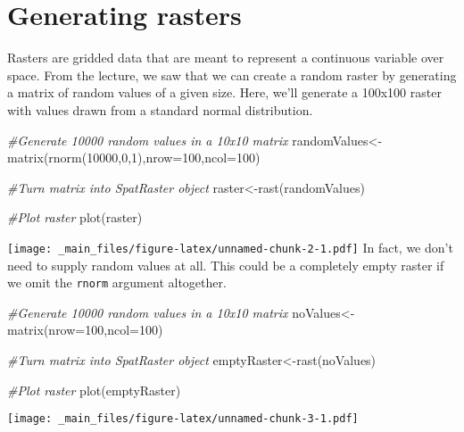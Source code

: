 \documentclass[
]{book}
\newenvironment{Shaded}{\begin{snugshade}}{\end{snugshade}}
\newcommand{\AttributeTok}[1]{\textcolor[rgb]{0.77,0.63,0.00}{#1}}
\newcommand{\CommentTok}[1]{\textcolor[rgb]{0.56,0.35,0.01}{\textit{#1}}}
\newcommand{\DecValTok}[1]{\textcolor[rgb]{0.00,0.00,0.81}{#1}}
\newcommand{\FunctionTok}[1]{\textcolor[rgb]{0.00,0.00,0.00}{#1}}
\newcommand{\NormalTok}[1]{#1}
\newcommand{\OtherTok}[1]{\textcolor[rgb]{0.56,0.35,0.01}{#1}}
\begin{document}
\hypertarget{generating-rasters}{%
\section{Generating rasters}\label{generating-rasters}}

Rasters are gridded data that are meant to represent a continuous variable over space. From the lecture, we saw that we can create a random raster by generating a matrix of random values of a given size. Here, we'll generate a 100x100 raster with values drawn from a standard normal distribution.

\begin{Shaded}
\begin{Highlighting}[]
\CommentTok{\#Generate 10000 random values in a 10x10 matrix}
\NormalTok{randomValues}\OtherTok{\textless{}{-}}\FunctionTok{matrix}\NormalTok{(}\FunctionTok{rnorm}\NormalTok{(}\DecValTok{10000}\NormalTok{,}\DecValTok{0}\NormalTok{,}\DecValTok{1}\NormalTok{),}\AttributeTok{nrow=}\DecValTok{100}\NormalTok{,}\AttributeTok{ncol=}\DecValTok{100}\NormalTok{)}

\CommentTok{\#Turn matrix into SpatRaster object}
\NormalTok{raster}\OtherTok{\textless{}{-}}\FunctionTok{rast}\NormalTok{(randomValues)}

\CommentTok{\#Plot raster}
\FunctionTok{plot}\NormalTok{(raster)}
\end{Highlighting}
\end{Shaded}

\texttt{[image: \_main\_files/figure-latex/unnamed-chunk-2-1.pdf]}
In fact, we don't need to supply random values at all. This could be a completely empty raster if we omit the \texttt{rnorm} argument altogether.

\begin{Shaded}
\begin{Highlighting}[]
\CommentTok{\#Generate 10000 random values in a 10x10 matrix}
\NormalTok{noValues}\OtherTok{\textless{}{-}}\FunctionTok{matrix}\NormalTok{(}\AttributeTok{nrow=}\DecValTok{100}\NormalTok{,}\AttributeTok{ncol=}\DecValTok{100}\NormalTok{)}

\CommentTok{\#Turn matrix into SpatRaster object}
\NormalTok{emptyRaster}\OtherTok{\textless{}{-}}\FunctionTok{rast}\NormalTok{(noValues)}

\CommentTok{\#Plot raster}
\FunctionTok{plot}\NormalTok{(emptyRaster)}
\end{Highlighting}
\end{Shaded}

\texttt{[image: \_main\_files/figure-latex/unnamed-chunk-3-1.pdf]}
\end{document}

